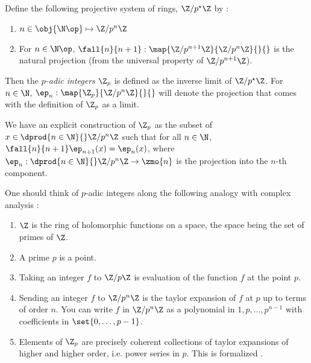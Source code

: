 \begin{dfn}
  
  Define the following projective system of rings, 
  $\Z/p^\star\Z$ by : 
  \begin{enumerate}
    \item $n \in \obj{\N\op} \mapsto \Z/p^n\Z$
    \item For $n \in \N\op$, $\fall{n}{n+1} : \map{\Z/p^{n+1}\Z}{\Z/p^n\Z}{}{}$
    is the natural projection (from the universal property of $\Z/p^{n+1}\Z$). 
  \end{enumerate}
  Then the \emph{$p$-adic integers} $\Z_p$ is defined as 
  the inverse limit of $\Z/p^\star\Z$. 
  For $n \in \N$, $\ep_n : \map{\Z_p}{\Z/p^n\Z}{}{}$ will denote the 
  projection that comes with the definition of $\Z_p$ as a limit. 

  We have an explicit construction of $\Z_p$ as 
  the subset of $x \in \dprod{n\in\N}{} \Z/p^n\Z$ such that 
  for all $n \in \N$, $\fall{n}{n+1}\ep_{n+1}(x) = \ep_n(x)$,
  where $\ep_n : \dprod{n\in\N}{} \Z/p^n\Z \to \zmo{n}$ is the projection into
  the $n$-th component. 
\end{dfn}

\begin{rmk}
  
  One should think of $p$-adic integers along the following analogy with 
  complex analysis : 
  \begin{enumerate}
    \item $\Z$ is the ring of holomorphic functions on a space,
    the space being the set of primes of $\Z$. 
    \item A prime $p$ is a point. 
    \item Taking an integer $f$ to $\Z/p\Z$ is evaluation of 
    the function $f$ at the point $p$. 
    \item Sending an integer $f$ to $\Z/p^n\Z$ is 
    the taylor expansion of $f$ at $p$
    up to terms of order $n$.
    You can write $f$ in $\Z/p^n\Z$ as a polynomial in $1,p,\dots,p^{n-1}$
    with coefficients in $\set{0,\dots,p-1}$. 
    \item Elements of $\Z_p$ are precisely 
    coherent collections of taylor expansions of higher and higher order,
    i.e. power series in $p$. 
    This is formalized .
  \end{enumerate}
\end{rmk}

